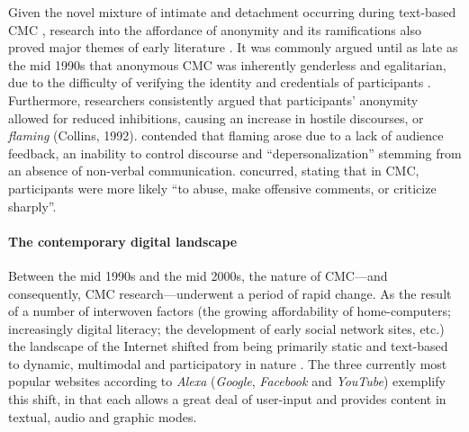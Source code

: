			Given the novel mixture of intimate and detachment occurring during text-based CMC \cite{king_researching_1996}, research into the affordance of anonymity and its ramifications also proved major themes of early literature \cite{tanis_two_2007}. It was commonly argued until as late as the mid 1990s that anonymous CMC was inherently genderless and egalitarian, due to the difficulty of verifying the identity and credentials of participants \cite{herring_computer-mediated_2001}. Furthermore, researchers consistently argued that participants' anonymity allowed for reduced inhibitions, causing an increase in hostile discourses, or \emph{flaming} (Collins, 1992). \textcite{kiesler_social_1984} contended that flaming arose due to a lack of audience feedback, an inability to control discourse and ``depersonalization'' stemming from an absence of non-verbal communication. \textcite[p.~7]{kim_verbal_1991} concurred, stating that in CMC, participants were more likely ``to abuse, make offensive comments, or criticize sharply''.

			\paragraph{The contemporary digital landscape}

				Between the mid 1990s and the mid 2000s, the nature of CMC---and consequently, CMC research---underwent a period of rapid change. As the result of a number of interwoven factors (the growing affordability of home-computers; increasingly digital literacy; the development of early social network sites, etc.) the landscape of the Internet shifted from being primarily static and text-based to dynamic, multimodal and participatory in nature \cite{herring_discourse_2011,lindholm_identity_2012}. The three currently most popular websites according to \emph{Alexa} (\emph{Google}, \emph{Facebook} and \emph{YouTube}) exemplify this shift, in that each allows a great deal of user-input and provides content in textual, audio and graphic modes.


